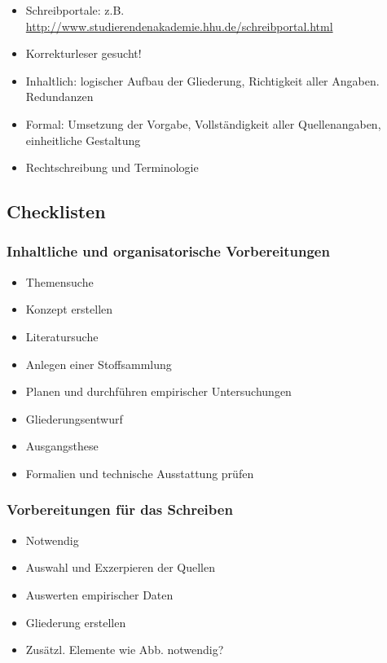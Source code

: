 \begin{itemize}%
\item
  Schreibportale: z.B.
  \url{http://www.studierendenakademie.hhu.de/schreibportal.html}
\item
  Korrekturleser gesucht!
\item
  Inhaltlich: logischer Aufbau der Gliederung, Richtigkeit aller
  Angaben. Redundanzen
\item
  Formal: Umsetzung der Vorgabe, Vollständigkeit aller Quellenangaben,
  einheitliche Gestaltung
\item
  Rechtschreibung und Terminologie
\end{itemize}

\subsection{Checklisten}\label{checklisten}

\subsubsection{Inhaltliche und organisatorische Vorbereitungen}\label{inhaltliche-und-organisatorische-vorbereitungen}

\begin{itemize}%
\item Themensuche
\item Konzept erstellen
\item Literatursuche
\item Anlegen einer Stoffsammlung
\item Planen und durchführen empirischer Untersuchungen
\item Gliederungsentwurf
\item Ausgangsthese
\item Formalien und technische Ausstattung prüfen 
\end{itemize}


\subsubsection{Vorbereitungen für das Schreiben}\label{vorbereitungen-fuer-das-schreiben}

\begin{itemize}%
\item Notwendig 
\item Auswahl und Exzerpieren der Quellen 
\item Auswerten empirischer Daten 
\item Gliederung erstellen 
\item Zusätzl. Elemente wie Abb. notwendig? 
\end{itemize}

